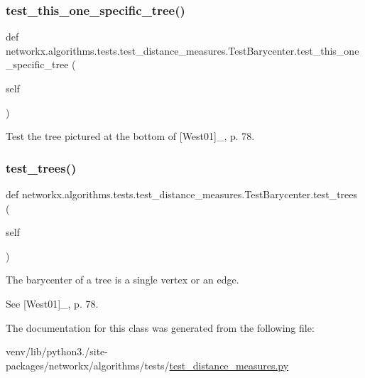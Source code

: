 \subsubsection{\texorpdfstring{test\+\_\+this\+\_\+one\+\_\+specific\+\_\+tree()}{test\_this\_one\_specific\_tree()}}
{\footnotesize\ttfamily def networkx.\+algorithms.\+tests.\+test\+\_\+distance\+\_\+measures.\+Test\+Barycenter.\+test\+\_\+this\+\_\+one\+\_\+specific\+\_\+tree (\begin{DoxyParamCaption}\item[{}]{self }\end{DoxyParamCaption})}

\begin{DoxyVerb}Test the tree pictured at the bottom of [West01]_, p. 78.\end{DoxyVerb}
 \mbox{\label{classnetworkx_1_1algorithms_1_1tests_1_1test__distance__measures_1_1TestBarycenter_a6fb1cd23206b29509dfc7cfdf386de51}} 
\subsubsection{\texorpdfstring{test\+\_\+trees()}{test\_trees()}}
{\footnotesize\ttfamily def networkx.\+algorithms.\+tests.\+test\+\_\+distance\+\_\+measures.\+Test\+Barycenter.\+test\+\_\+trees (\begin{DoxyParamCaption}\item[{}]{self }\end{DoxyParamCaption})}

\begin{DoxyVerb}The barycenter of a tree is a single vertex or an edge.

See [West01]_, p. 78.
\end{DoxyVerb}
 

The documentation for this class was generated from the following file\+:\begin{DoxyCompactItemize}
\item 
venv/lib/python3./site-\/packages/networkx/algorithms/tests/\hyperlink{tests_2test__distance__measures_8py}{test\+\_\+distance\+\_\+measures.\+py}\end{DoxyCompactItemize}
